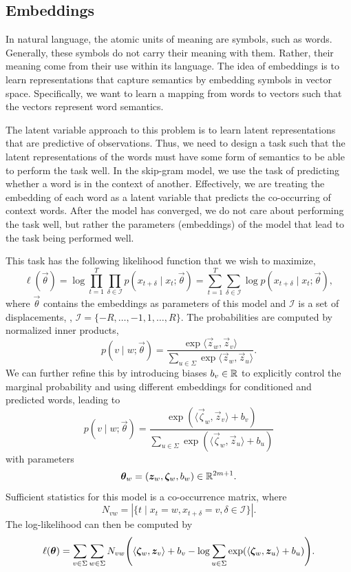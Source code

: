 \subsection{Embeddings}

In natural language, the atomic units of meaning are symbols, such as words. Generally, these
symbols do not carry their meaning with them. Rather, their meaning come from their use within its
language. The idea of embeddings is to learn representations that capture semantics by embedding
symbols in vector space. Specifically, we want to learn a mapping from words to vectors such that
the vectors represent word semantics.

The latent variable approach to this problem is to learn latent representations that are predictive
of observations. Thus, we need to design a task such that the latent representations of the words
must have some form of semantics to be able to perform the task well. In the skip-gram model, we
use the task of predicting whether a word is in the context of another. Effectively, we are treating the embedding of
each word as a latent variable that predicts the co-occurring of context words. After the model has
converged, we do not care about performing the task well, but rather the parameters (embeddings) of
the model that lead to the task being performed well.

This task has the following likelihood function that we wish to maximize, \[
    \ell(\vec{\theta}) = \log \prod_{t=1}^{T} \prod_{\delta \in \mathcal{I}} p(x_{t+\delta} \mid x_t; \vec{\theta}) = \sum_{t=1}^{T} \sum_{\delta \in \mathcal{I}} \log p(x_{t+\delta} \mid x_t; \vec{\theta}),
\]
where $\vec{\theta}$ contains the embeddings as parameters of this model and $\mathcal{I}$ is a set
of displacements, \eg, $\mathcal{I} = \{ -R, \ldots, -1, 1, \ldots, R \}$. The probabilities are
computed by normalized inner products, \[
    p(v \mid w; \vec{\theta}) = \frac{\exp \langle \vec{z}_w, \vec{z}_v \rangle}{\sum_{u \in \Sigma} \exp \langle \vec{z}_w, \vec{z}_u \rangle}.
\]
We can further refine this by introducing biases $b_v \in \mathbb{R}$ to explicitly control the marginal
probability and using different embeddings for conditioned and predicted words, leading to \[
    p(v \mid w; \vec{\theta}) = \frac{\exp(\langle \vec{\zeta}_w, \vec{z}_v \rangle + b_v)}{\sum_{u \in \Sigma} \exp(\langle \vec{\zeta}_w, \vec{z}_u \rangle + b_u)}
\]
with parameters \[
    \bm{\theta}_w = (\bm{z}_w, \bm{\zeta}_w, b_w) \in \mathbb{R}^{2m+1}.
\]
Sufficient statistics for this model is a co-occurrence matrix, where \[
    N_{vw} = | \{ t \mid x_t = w, x_{t+\delta}=v, \delta \in \mathcal{I} \} |.
\]
The log-likelihood can then be computed by \[
    \ell(\vec{\theta}) = \sum_{v \in \Sigma} \sum_{w \in \Sigma} N_{vw} \lft( \langle \vec{\zeta}_w, \vec{z}_v \rangle + b_v - \log \sum_{u \in \Sigma} \exp (\langle \vec{\zeta}_w, \vec{z}_u \rangle + b_u) \rgt).
\]

